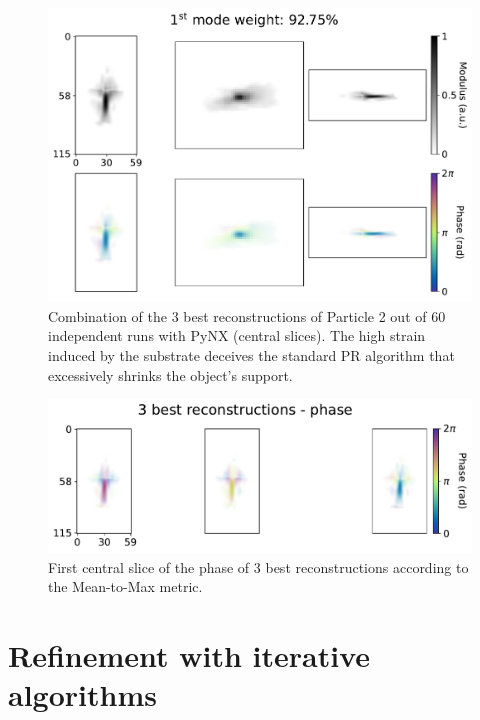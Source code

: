 \begin{figure}[H]
    \centering
    \includegraphics[width=\textwidth]{figures/Phasing/cdiutils_particle2.pdf}
    \caption{Combination of the 3 best reconstructions of Particle 2 out of 60 independent runs with PyNX (central slices). 
    The high strain induced by the substrate deceives the standard PR algorithm that excessively shrinks the object's support.}
    \label{fig:pynx_rec2}
\end{figure}
\begin{figure}[H]
    \centering
    \includegraphics[width=\textwidth]{figures/Phasing/modes_particle2.pdf}
    \caption{First central slice of the phase of 3 best reconstructions according to the Mean-to-Max metric.  }
    \label{fig:modes_rec2}
\end{figure}

\section{Refinement with iterative algorithms}\label{chp:refinement}

